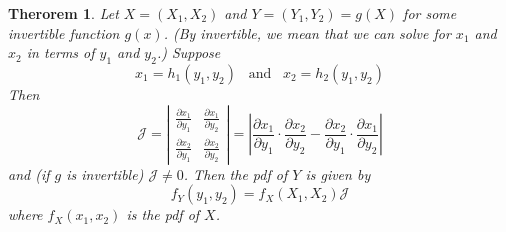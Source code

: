 \documentclass[12pt]{article} %
\newtheorem{thm}{Therorem}
\begin{document}
\begin{thm}
Let $X=(X_1,X_2)$ and $Y= (Y_1,Y_2) =g(X)$ for some invertible function $g(x)$. (By invertible, we mean that we can solve for $x_1$ and $x_2$ in terms of $y_1$ and $y_2$.) Suppose
$$x_1 = h_1(y_1,y_2) \;\;\; \mathrm{ and } \;\;\; x_2=h_2(y_1,y_2)$$
Then
$$\mathcal{J} = \left|\begin{matrix}
\frac{\partial x_1}{\partial y_1} &\frac{\partial x_1}{\partial y_2} \\
\frac{\partial x_2}{\partial y_1} &\frac{\partial x_2}{\partial y_2} 
\end{matrix}\right| = \left|\frac{\partial x_1}{\partial y_1}\cdot\frac{\partial x_2}{\partial y_2} -  \frac{\partial x_2}{\partial y_1}\cdot \frac{\partial x_1}{\partial y_2}\right|$$
and (if $g$ is invertible) $\mathcal{J} \neq 0$. Then the pdf of $Y$ is given by
$$f_Y(y_1,y_2) = f_X(X_1,X_2) \mathcal{J}$$
where $f_X(x_1,x_2)$ is the pdf of $X$.
\end{thm}
\end{document}
